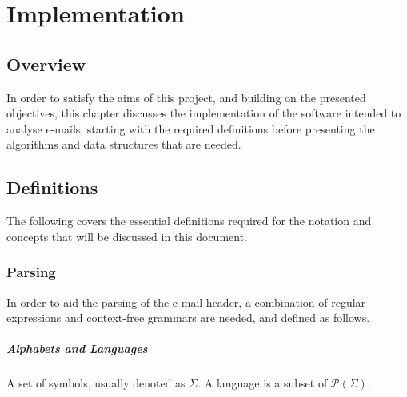 \chapter{Implementation}\label{chap:imp}

\section{Overview}

In order to satisfy the aims of this project, and building on the presented
objectives, this chapter discusses the implementation of the software intended
to analyse e-mails, starting with the required definitions before presenting
the algorithms and data structures that are needed.

\section{Definitions}

The following covers the essential definitions required for the notation and
concepts that will be discussed in this document.

\subsection{Parsing}

In order to aid the parsing of the e-mail header, a combination of regular
expressions and context-free grammars are needed, and defined as follows.

\paragraph{Alphabets and Languages}

A set of symbols, usually denoted as $\Sigma$.  A language is a subset of
$\mathcal P (\Sigma)$.


